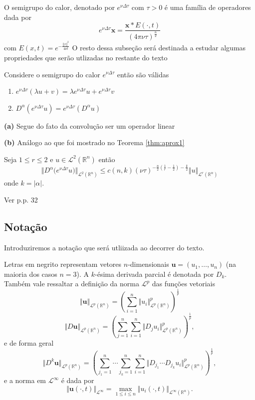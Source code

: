 \documentclass[a4paper, 11pt]{book}
\theoremstyle{definition}
\newcommand{\bR}{\mathbb{R}}
\newcommand{\bu}{\mathbf{u}}
\newcommand{\cL}{\mathcal{L}}
\begin{document}
O semigrupo do calor, denotado por $e^{\nu \Delta \tau}$ com $\tau > 0$ é uma família de operadores dada por
\[
    e^{\nu \Delta \tau} \mathbf{x} = \frac{\mathbf{x} * E(\cdot,t)}{(4\pi \nu \tau)^{\frac{n}{2}}}
\]
com $E(x,t) = e^{-\frac{\Vert x \Vert^2}{4 \nu t}}$
O resto dessa subseção será destinada a estudar algumas propriedades que serão utlizadas no restante do texto

\begin{pbox}
    Considere o semigrupo do calor $e^{\nu\Delta\tau}$ então são válidas
    \begin{enumerate}[leftmargin=*, label=\textbf{(\alph*)}]
        \item $e^{\nu\Delta\tau}(\lambda u + v) = \lambda e^{\nu\Delta\tau} u + e^{\nu\Delta\tau} v$
        \item $D^\alpha (e^{\nu\Delta\tau} u) = e^{\nu\Delta\tau} (D^\alpha u)$
    \end{enumerate}
\end{pbox} 
\begin{prf}
    \textbf{(a)} Segue do fato da convolução ser um operador linear

    \textbf{(b)} Análogo ao que foi mostrado no Teorema \ref{thm:aprox1}
\end{prf}

\begin{pbox}
    Seja $1 \leqslant r \leqslant 2$ e $u \in \cL^2(\bR^n)$ então
    \begin{equation} \label{eq:estimativa-util}
        \Vert D^{\alpha} \big( e^{\nu\Delta\tau} u \big) \Vert_{\cL^2(\bR^n)} \leqslant c(n,k) (\nu\tau)^{-\frac{n}{2}\left( \frac{1}{r} - \frac{1}{2} \right) - \frac{k}{2}} \Vert u \Vert_{\cL^r(\bR^n)} 
    \end{equation} 
    onde $k = |\alpha|$.
\end{pbox}
\begin{prf}
    Ver \cite{lorenz-navier.stokes} p.p. 32
\end{prf}

\subsection{Notação}

Introduziremos a notação que será utliizada ao decorrer do texto.   

Letras em negrito representam vetores $n$-dimensionais $\bu = (u_1,\dots,u_n)$ (na maioria dos casos $n = 3$).
A $k$-ésima derivada parcial é denotada por $D_k$.
Também vale ressaltar a definição da norma $\cL^p$ das funções vetoriais
\[
    \Vert \bu \Vert_{\cL^p(\bR^n)} = \left( \sum_{i=1}^n \Vert u_i \Vert_{\cL^p(\bR^n)}^p \right)^{\frac{1}{p}}
\]
\[
    \Vert D\bu \Vert_{\cL^p(\bR^n)} = \left( \sum_{j=1}^n\sum_{i=1}^n \Vert D_ju_i \Vert_{\cL^p(\bR^n)}^p \right)^{\frac{1}{p}},
\]
e de forma geral
\[
    \Vert D^k\bu \Vert_{\cL^p(\bR^n)} = \left( \sum_{j_1 = 1}^n \cdots \sum_{j_k  =1}^{n}\sum_{i=1}^n \Vert D_{j_1} \cdots D_{j_k}u_i \Vert_{\cL^p(\bR^n)}^p \right)^{\frac{1}{p}},
\]
e a norma em $\cL^\infty$ é dada por
\[
    \Vert \bu(\cdot,t) \Vert_{\cL^\infty} = \max_{1 \leqslant i \leqslant n} \Vert u_i(\cdot,t) \Vert_{\cL^\infty(\bR^n)}.
\]
\end{document}
